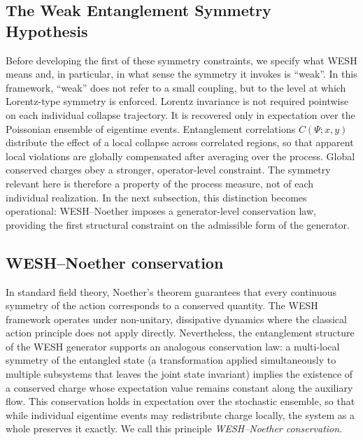 \documentclass[12pt,a4paper]{article}
\numberwithin{equation}{section}
\begin{document}
\vspace{0.5cm}
\subsection{The Weak Entanglement Symmetry Hypothesis}
\vspace{0.3cm}

Before developing the first of these symmetry constraints, we specify
what WESH means and, in particular, in what sense the symmetry it
invokes is ``weak''. In this framework, ``weak'' does not refer to a small
coupling, but to the level at which Lorentz-type symmetry is enforced.
Lorentz invariance is not required pointwise on each individual collapse
trajectory. It is recovered only in expectation over the Poissonian ensemble
of eigentime events. Entanglement correlations $C(\Psi;x,y)$ distribute the
effect of a local collapse across correlated regions, so that apparent local
violations are globally compensated after averaging over the process. Global
conserved charges obey a stronger, operator-level constraint. The symmetry
relevant here is therefore a property of the process measure, not of each
individual realization. In the next subsection, this distinction becomes
operational: WESH--Noether imposes a generator-level conservation law,
providing the first structural constraint on the admissible form of the
generator.
\vspace{0.5cm}

\subsection{WESH--Noether conservation}
\label{sec:wesh-noether}

\vspace{0.3cm}

In standard field theory, Noether's theorem guarantees that every continuous symmetry of the action corresponds to a conserved quantity. The WESH framework operates under non-unitary, dissipative dynamics where the classical action principle does not apply directly. Nevertheless, the entanglement structure of the WESH generator supports an analogous conservation law: a multi-local symmetry of the entangled state (a transformation applied simultaneously to multiple subsystems that leaves the joint state invariant) implies the existence of a conserved charge whose expectation value remains constant along the auxiliary flow. This conservation holds in expectation over the stochastic ensemble, so that while individual eigentime events may redistribute charge locally, the system as a whole preserves it exactly. We call this principle \emph{WESH--Noether conservation}.
\end{document}

